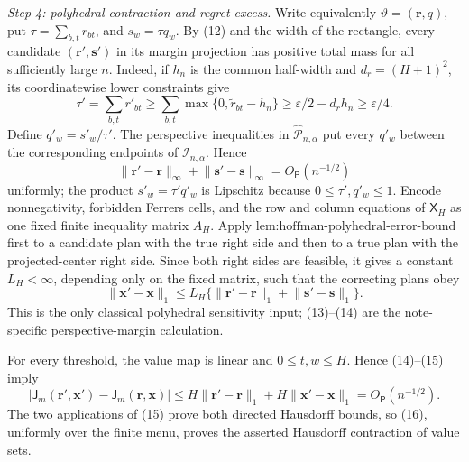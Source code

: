 \emph{Step 4: polyhedral contraction and regret excess.}
Write equivalently \(\vartheta=(\mathbf r,q)\), put \(\tau=\sum_{b,t}r_{bt}\), and
\(s_w=\tau q_w\).  By (12) and the width of the rectangle, every candidate
\((\mathbf r',\mathbf s')\) in its margin projection has positive total mass for all sufficiently large \(n\).  Indeed, if \(h_n\) is the common half-width and \(d_r=(H+1)^2\), its coordinatewise lower constraints give
\[
 \tau'=\sum_{b,t}r'_{bt}
 \ge\sum_{b,t}\max\{0,\widetilde r_{bt}-h_n\}
 \ge\varepsilon/2-d_rh_n\ge\varepsilon/4.                \tag{13}
\]
Define \(q'_w=s'_w/\tau'\).  The perspective inequalities in
\(\widehat{\mathcal P}_{n,\alpha}\) put every \(q'_w\) between the corresponding endpoints of \(\mathcal I_{n,\alpha}\).  Hence
\[
 \lVert\mathbf r'-\mathbf r\rVert_\infty
 +\lVert\mathbf s'-\mathbf s\rVert_\infty
 =O_{\mathsf P}(n^{-1/2})                                \tag{14}
\]
uniformly; the product \(s'_w=\tau' q'_w\) is Lipschitz because
\(0\le\tau',q'_w\le1\).  Encode nonnegativity, forbidden Ferrers cells, and the row and column equations of \(\mathsf X_H\) as one fixed finite inequality matrix \(A_H\).  Apply \(\text{lem:hoffman-polyhedral-error-bound}\) first to a candidate plan with the true right side and then to a true plan with the projected-center right side.  Since both right sides are feasible, it gives a constant \(L_H<\infty\), depending only on the fixed matrix, such that the correcting plans obey
\[
 \lVert\mathbf x'-\mathbf x\rVert_1
 \le L_H\{
 \lVert\mathbf r'-\mathbf r\rVert_1+
 \lVert\mathbf s'-\mathbf s\rVert_1\}.                  \tag{15}
\]
This is the only classical polyhedral sensitivity input; (13)--(14) are the note-specific perspective-margin calculation.

For every threshold, the value map is linear and \(0\le t,w\le H\).  Hence (14)--(15) imply
\[
 |\mathsf J_m(\mathbf r',\mathbf x')-
   \mathsf J_m(\mathbf r,\mathbf x)|
 \le H\lVert\mathbf r'-\mathbf r\rVert_1+
      H\lVert\mathbf x'-\mathbf x\rVert_1
 =O_{\mathsf P}(n^{-1/2}).                               \tag{16}
\]
The two applications of (15) prove both directed Hausdorff bounds, so (16), uniformly over the finite menu, proves the asserted Hausdorff contraction of value sets.

